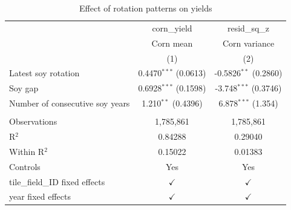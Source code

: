 
\begin{table}[htbp]
   \caption{\label{tab:zvector} Effect of rotation patterns on yields}
   \bigskip
   \centering
   \begin{tabular}{lcc}
      \toprule
                                      & corn\_yield             & resid\_sq\_z\\
                                      & Corn mean               & Corn variance \\
                                      & (1)                     & (2)\\
      \midrule
      Latest soy rotation             & 0.4470$^{***}$ (0.0613) & -0.5826$^{**}$ (0.2860)\\
      Soy gap                         & 0.6928$^{***}$ (0.1598) & -3.748$^{***}$ (0.3746)\\
      Number of consecutive soy years & 1.210$^{**}$ (0.4396)   & 6.878$^{***}$ (1.354)\\
       \\
      Observations                    & 1,785,861               & 1,785,861\\
      R$^2$                           & 0.84288                 & 0.29040\\
      Within R$^2$                    & 0.15022                 & 0.01383\\
      Controls                        & Yes                     & Yes\\
      tile\_field\_ID fixed effects   & $\checkmark$            & $\checkmark$\\
      year fixed effects              & $\checkmark$            & $\checkmark$\\
      \bottomrule
   \end{tabular}
\end{table}
